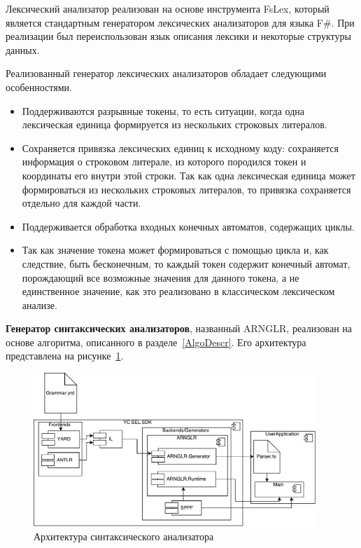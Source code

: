 Лексический анализатор реализован на основе инструмента FsLex, который является стандартным генератором лексических анализаторов для языка F\#. При реализации был переиспользован язык описания лексики и некоторые структуры данных.

Реализованный генератор лексических анализаторов обладает следующими особенностями.
\begin{itemize}
    \item Поддерживаются разрывные токены, то есть ситуации, когда одна лексическая единица формируется из нескольких строковых литералов.
    \item Сохраняется привязка лексических единиц к исходному коду: сохраняется информация о строковом литерале, из которого породился токен и координаты его внутри этой строки. Так как одна лексическая единица может формироваться из нескольких строковых литералов, то привязка сохраняется отдельно для каждой части.
    \item Поддерживается обработка входных конечных автоматов, содержащих циклы.
    \item Так как значение токена может формироваться с помощью цикла и, как следствие, быть бесконечным, то каждый токен содержит конечный автомат, порождающий все возможные значения для данного токена, а не единственное значение, как это реализовано в классическом лексическом анализе.
\end{itemize}

\textbf{Генератор синтаксических анализаторов}, названный ARNGLR, реализован на основе алгоритма, описанного в разделе~\ref{AlgoDescr}. Его архитектура представлена на рисунке~\ref{fig:ParsArch}.  

\begin{figure}[h!]
\begin{center}
\includegraphics[width=0.95\textwidth]{pics/ARNGLRArch}
\caption{Архитектура синтаксического анализатора}
\label{fig:ParsArch} 
\end{center}
\end{figure}

